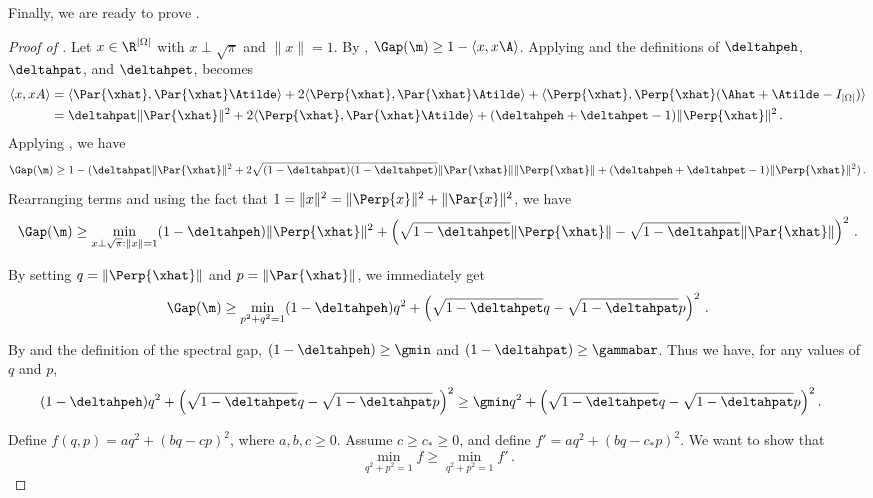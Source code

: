 \documentclass{toc}
\begin{document}
Finally, we are ready to prove . 

%
%
%
\begin{proof}[Proof of ]
Let $x\in \R^{|\Omega|}$ with $x\perp \sqrt{\pi}$ and $\|x\|=1$.  By , 
$\Gap(\m) \geq 1-\langle x,x\A\rangle$.  
Applying  and the definitions of $\deltahpeh$, $\deltahpat$,
and $\deltahpet$,  becomes
\begin{align}
 \langle {x},{x}A\rangle&=  \langle \Par{\xhat},\Par{\xhat}\Atilde\rangle +2
  \langle\Perp{\xhat},\Par{\xhat}\Atilde\rangle
  +\langle\Perp{\xhat},\Perp{\xhat}(\Ahat+\Atilde-I_{|\Omega|})\rangle\nonumber\\
  &= \deltahpat \|\Par{\xhat}\|^2 +2 \langle\Perp{\xhat},\Par{\xhat}\Atilde\rangle
  +(\deltahpeh +\deltahpet -1)\|\Perp{\xhat}\|^2\,.\label{eq:strongestbound}
\end{align}
Applying , we have
\[ \Gap(\m) \geq 1 - (\deltahpat \|\Par{\xhat}\|^2 + 
2 \sqrt{(1-\deltahpat)(1-\deltahpet)}\|\Par{\xhat}\|\|\Perp{\xhat}\|
+(\deltahpeh +\deltahpet -1)\|\Perp{\xhat}\|^2)\,.
\]
Rearranging terms and using the fact that
$1=\|x\|^2=\|\Perp{x}\|^2+\|\Par{x}\|^2$, we have
\begin{equation}\label{eq:main}
\Gap(\m) \geq \min_{x\perp\sqrt{\pi}:\|x\|=1} 
(1-\deltahpeh)\|\Perp{\xhat}\|^2+\left(\sqrt{1-\deltahpet}\|\Perp{\xhat}\| - \sqrt{1-\deltahpat}\|\Par{\xhat}\|\right)^2\,.
\end{equation}

By setting $q=\|\Perp{\xhat}\|$ and $p=\|\Par{\xhat}\|$, we immediately get
\[\Gap(\m) \geq \min_{p^2+q^2=1} 
(1-\deltahpeh)q^2+\left(\sqrt{1-\deltahpet}q - \sqrt{1-\deltahpat}p\right)^2\,.\] 


By  and the definition of the spectral gap, $(1-\deltahpeh)\geq \gmin$ and
 $(1-\deltahpat)\geq \gammabar$.   Thus we have, for any values of $q$ and $p$, 
\begin{align*}
(1-\deltahpeh)q^2+\left(\sqrt{1-\deltahpet}q - \sqrt{1-\deltahpat}p\right)^2
&\geq \gmin q^2+\left(\sqrt{1-\deltahpet}q - \sqrt{1-\deltahpat}p\right)^2.
\end{align*}


Define $f(q,p) = a q^2 + (bq-cp)^2$, where $a,b,c\geq 0$.  Assume $c\geq c_*\geq 0$, and define $f'= a q^2 + (bq-c_*p)^2$.  We want to show that
\begin{equation}\label{eq:lowerbound}
 \min_{q^2+p^2=1} f \geq  \min_{q^2+p^2=1} f'\,.
\end{equation}


\end{proof}
\end{document}
